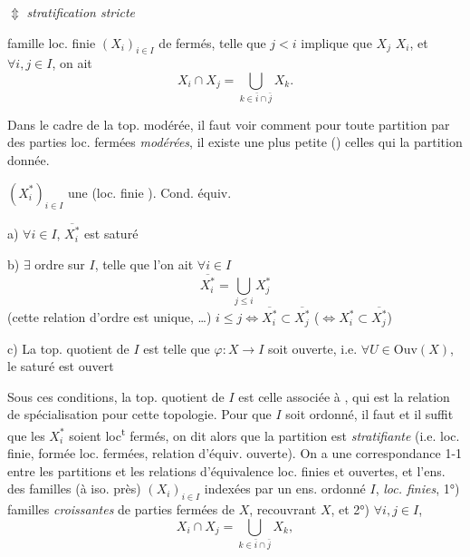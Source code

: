 \documentclass[11pt,a4paper]{article}
\begin{document}
 $\Updownarrow$ \emph{stratification stricte} 

famille loc. finie $(X_i)_{i\in I}$ de fermés, telle que $j<i$ implique que $X_j$  $X_i$, et $\forall i,j\in I$, on ait
\[
X_i\cap X_j=\bigcup_{k\in\bar i\cap\bar j}X_k .
\]



Dans le cadre de la top. modérée, il faut voir comment pour toute partition par des parties loc. fermées \emph{modérées}, il existe une plus petite    () \ill{} celles qui  la partition donnée.



$(X_i^{*})_{i\in I}$ une   (loc. finie  ). Cond. équiv.

a) $\forall i\in I$,  $\overline{X_i^{*}}$ est saturé 

b) $\exists$  ordre sur $I$, telle que l'on ait $\forall i\in I$
\[
\overline{X_i^{*}}=\bigcup_{j\le i}X_j^{*}
\]
(cette relation \struck{\ill{}} d'ordre est unique, \ldots)
$i\le j\Longleftrightarrow \overline{X_i^{*}}\subset\overline{X_j^{*}}$ ($\Longleftrightarrow X_i^{*}\subset\overline{X_j^{*}}$)

c) La top. quotient de $I$ est telle que $\varphi:X\to I$ soit ouverte, i.e. $\forall U\in\mathrm{Ouv}(X)$, le saturé est ouvert

Sous ces conditions, la top. quotient de $I$ est celle \ill{} associée à  , qui est  la relation de spécialisation pour cette topologie. Pour que $I$ soit ordonné, il faut et il suffit que les $X_i^{*}$ soient loc\textsuperscript{t} fermés, on dit alors que la partition est \emph{stratifiante} (i.e. \ill{} loc. finie, formée  loc. fermées, relation d'équiv. ouverte).  On a une correspondance 1-1 entre les partitions   \struck{\ill{}} et les relations d'équivalence loc. finies  et ouvertes, et l'ens. des familles (à iso. près) $(X_i)_{i\in I}$ indexées par un ens. ordonné $I$, \emph{loc. finies}, 1°) familles \emph{croissantes} de parties fermées de $X$, \struck{\ill{}} recouvrant $X$, et 2°) $\forall i,j\in I$,
\[
X_i\cap X_j=\bigcup_{k\in\bar i\cap\bar j}X_k ,
\]
 
\end{document}
